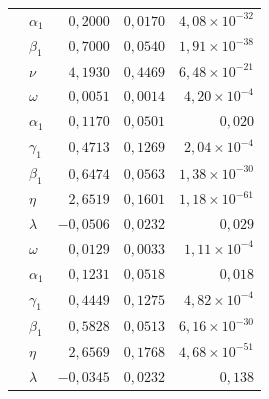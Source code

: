 \documentclass[12pt]{paper}
\begin{document}
\begin{table}[H]
{\begin{tabular}{llrrr}
 & $\alpha_1$ & $0{,}2000$ & $0{,}0170$ & $4{,}08\times10^{-32}$ \\
 & $\beta_1$ & $0{,}7000$ & $0{,}0540$ & $1{,}91\times10^{-38}$ \\
 & $\nu$ & $4{,}1930$ & $0{,}4469$ & $6{,}48\times10^{-21}$ \\
\hline
{} & $\omega$ & $0{,}0051$ & $0{,}0014$ & $4{,}20\times10^{-4}$ \\
 & $\alpha_1$ & $0{,}1170$ & $0{,}0501$ & $0{,}020$ \\
 & $\gamma_1$ & $0{,}4713$ & $0{,}1269$ & $2{,}04\times10^{-4}$ \\
 & $\beta_1$ & $0{,}6474$ & $0{,}0563$ & $1{,}38\times10^{-30}$ \\
 & $\eta$ & $2{,}6519$ & $0{,}1601$ & $1{,}18\times10^{-61}$ \\
 & $\lambda$ & $-0{,}0506$ & $0{,}0232$ & $0{,}029$ \\
\hline
{} & $\omega$ & $0{,}0129$ & $0{,}0033$ & $1{,}11\times10^{-4}$ \\
 & $\alpha_1$ & $0{,}1231$ & $0{,}0518$ & $0{,}018$ \\
 & $\gamma_1$ & $0{,}4449$ & $0{,}1275$ & $4{,}82\times10^{-4}$ \\
 & $\beta_1$ & $0{,}5828$ & $0{,}0513$ & $6{,}16\times10^{-30}$ \\
 & $\eta$ & $2{,}6569$ & $0{,}1768$ & $4{,}68\times10^{-51}$ \\
 & $\lambda$ & $-0{,}0345$ & $0{,}0232$ & $0{,}138$ \\
\hline
\end{tabular}%
}
\end{table}
\end{document}
